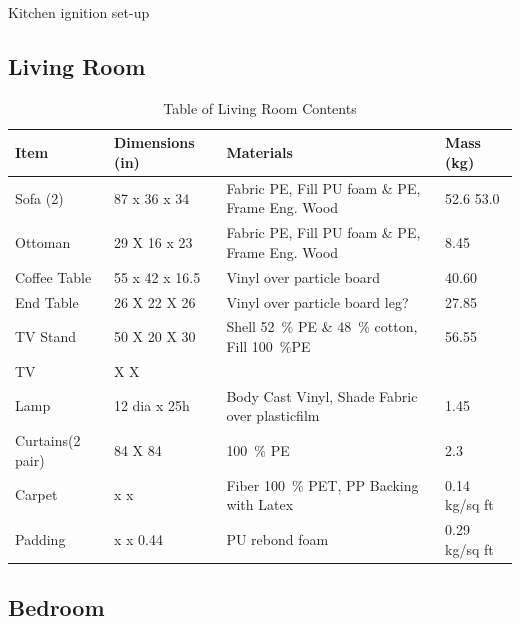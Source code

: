 \documentclass[12pt,oneside]{book}
\begin{document}
Kitchen ignition set-up   




\subsection{Living Room}

\begin{table}[!ht]
	\centering
	\caption{Table of Living Room Contents}
	\label{tab:BRFuel}
	\begin{tabular}{llll}
		\toprule[1.5pt]
		Item 				& Dimensions (in) 	& Materials 										& Mass (kg)  \\
		\midrule
		Sofa (2) 		  	& 87 x 36 x 34  	& Fabric PE, Fill PU foam \& PE, Frame Eng. Wood	& 52.6 53.0      \\
		Ottoman     		& 29 X 16 x 23 		& Fabric PE, Fill PU foam \& PE, Frame Eng. Wood   	& 8.45       \\
		Coffee Table   		& 55 x 42 x 16.5	& Vinyl over particle board  						& 40.60     \\
		End Table      		& 26 X 22 X 26 		& Vinyl over particle board  leg? 					& 27.85     \\	
		TV Stand	 		& 50 X 20 X 30 		& Shell 52~\% PE \& 48~\% cotton, Fill 100~\%PE 	& 56.55   \\	
		TV 					&    X    X 		& 										  			&         \\
		Lamp 				& 12 dia x 25h		& Body Cast Vinyl, Shade Fabric over plasticfilm	& 1.45  \\
		Curtains(2 pair) 	& 84 X 84 			& 100~\% PE 										& 2.3   \\
		Carpet				&  x  x 			& Fiber 100~\% PET, PP Backing with Latex			& 0.14 kg/sq ft \\
		Padding				&  x  x 0.44		& PU rebond foam									& 0.29 kg/sq ft	\\
		\bottomrule[1.25pt]
	\end{tabular}
\end{table}



\subsection{Bedroom}
\end{document}
